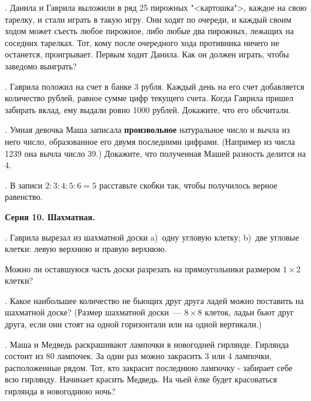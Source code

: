 . Данила и Гаврила выложили в ряд 25 пирожных "<картошка">, каждое на свою тарелку, и стали 
играть в такую игру. Они ходят по очереди, и каждый своим ходом может 
съесть любое пирожное, либо любые два пирожных, лежащих на соседних тарелках. 
Тот, кому после очередного хода противника ничего 
не останется, проигрывает.
Первым ходит Данила. Как он должен играть, чтобы заведомо выиграть?

.  Гаврила положил на счет в банке 3 рубля. Каждый день на его
счет добавляется количество рублей, равное сумме цифр текущего счета.
Когда Гаврила пришел забирать вклад, ему выдали ровно 1000 рублей. Докажите, что
его обсчитали.


. Умная девочка Маша записала \textbf{произвольное} 
натуральное число и вычла из него число, образованное его 
двумя последними цифрами. (Например из числа 1239 она вычла число 39.)
Докажите, что полученная Машей разность делится на 4.

. В записи $2 : 3 : 4 : 5 : 6 = 5$
расставьте скобки так, чтобы получилось верное равенство.

\centerline{\bf Серия 10. Шахматная.}

. Гаврила вырезал из шахматной доски \quad
a)~одну угловую клетку; \quad
b)~две угловые клетки: левую верхнюю и правую верхнюю. \quad

Можно ли оставшуюся часть доски разрезать на
прямоугольники размером $1\times 2$ клетки?

. Какое наибольшее количество не бьющих друг друга ладей можно поставить
на шахматной доске? (Размер шахматной доски~--- $8\times 8$ клеток,
ладьи бьют друг друга, если они стоят на одной горизонтали
или на одной вертикали.)

. Маша и Медведь раскрашивают лампочки в новогодней гирлянде. 
Гирлянда состоит из 80 лампочек. За один раз можно закрасить 3 или 4 лампочки,
расположенные рядом. Тот, кто закрасит последнюю лампочку - забирает себе всю гирлянду. 
Начинает красить Медведь. На чьей ёлке будет красоваться гирлянда в новогоднюю ночь? 

